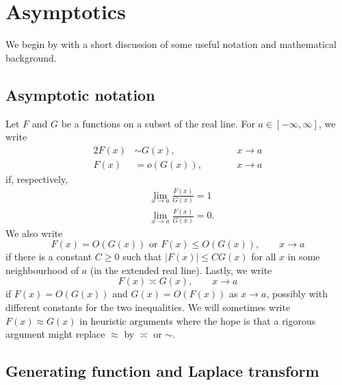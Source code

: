 
\section{Asymptotics}
\label{sec:asymp}

We begin by with a short discussion of some useful notation and mathematical
background.


\subsection{Asymptotic notation}

Let $F$ and $G$ be a functions on a subset of the real line.
For $a\in[-\infty,\infty]$, we write
\begin{alignat}{2}
F(x) &\sim G(x), &&\qquad x \to a \\
F(x) &= o(G(x)), &&\qquad x \to a
\end{alignat}
if, respectively,
\begin{align}
&\lim_{x\to a} \frac{F(x)}{G(x)} = 1 \\
&\lim_{x\to a} \frac{F(x)}{G(x)} = 0.
\end{align}
We also write
\begin{equation}
F(x) = O(G(x))
	\text{ or }
F(x) \le O(G(x)),
	\qquad
x \to a
\end{equation}
if there is a constant $C \ge 0$ such that $|F(x)| \le C G(x)$ for all
$x$ in some neighbourhood of $a$ (in the extended real line). Lastly, we write
\begin{equation}
F(x) \asymp G(x),
	\qquad
x \to a
\end{equation}
if $F(x) = O(G(x))$ and $G(x) = O(F(x))$ as $x\to a$, possibly with
different constants for the two inequalities. We will sometimes write
$F(x) \approx G(x)$ in heuristic
arguments where the hope is that a rigorous argument might replace $\approx$
by $\asymp$ or $\sim$.


\subsection{Generating function and Laplace transform}

